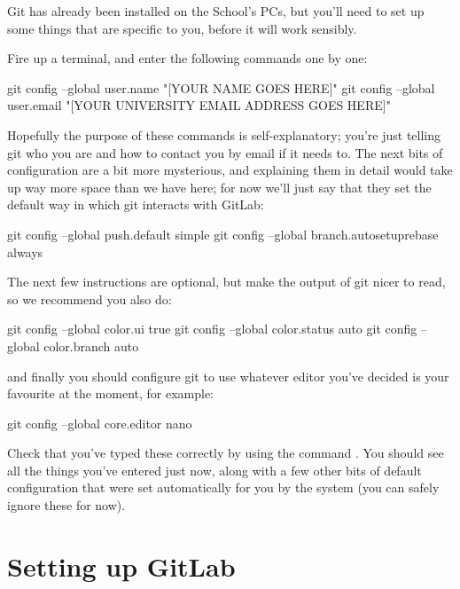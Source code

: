 Git has already been installed on the School's PCs, but you'll need to set up some things that are specific to you, before it will work sensibly. 

Fire up a terminal, and enter the following commands one by one:

\begin{ttoutenv}
git config --global user.name "[YOUR NAME GOES HERE]"
git config --global user.email "[YOUR UNIVERSITY EMAIL ADDRESS GOES HERE]" 
\end{ttoutenv}

Hopefully the purpose of these commands is self-explanatory; you're just telling git who you are and how to contact you by email if it needs to. The next bits of configuration are a bit more mysterious, and explaining them in detail would take up way more space than we have here; for now we'll just say that they set the default way in which git interacts with GitLab:

\begin{ttoutenv}
git config --global push.default simple
git config --global branch.autosetuprebase always 
\end{ttoutenv}

The next few instructions are optional, but make the output of git nicer to read, so we recommend you also do:

\begin{ttoutenv}
git config --global color.ui true
git config --global color.status auto
git config --global color.branch auto 
\end{ttoutenv}

and finally you should configure git to use whatever editor you've decided is your favourite at the moment, for example:

\begin{ttoutenv}
git config --global core.editor nano 
\end{ttoutenv}

Check that you've typed these correctly by using the command . You should see all the things you've entered just now, along with a few other bits of default configuration that were set automatically for you by the system (you can safely ignore these for now).

\section{Setting up GitLab}

